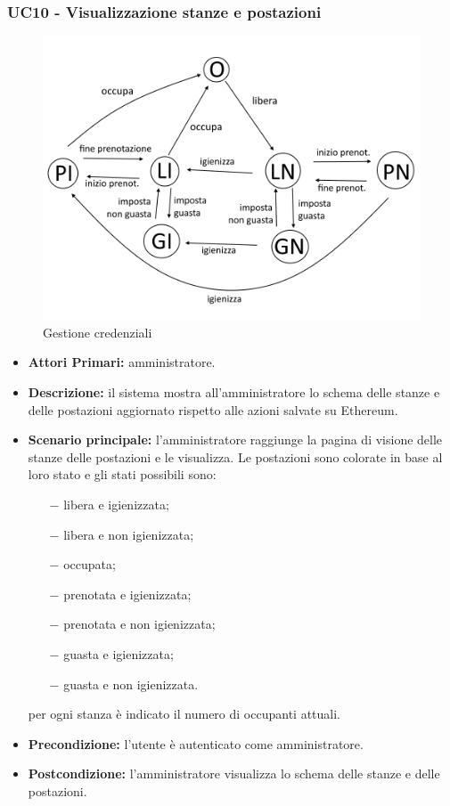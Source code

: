 \subsubsection{ UC10 - Visualizzazione stanze e postazioni}
\begin{figure}[H]
	\centering
	\includegraphics[width=15cm]{res/images/UC10.png}
	\caption{Gestione credenziali}
	\label{fig:stati postazioni}
\end{figure}
\begin{itemize}
	\item\textbf{Attori Primari:}
	amministratore.
	\item\textbf{Descrizione:}
	il sistema mostra all'amministratore lo schema delle stanze e delle postazioni aggiornato rispetto alle azioni salvate su Ethereum.
	\item\textbf{Scenario principale:}
	l'amministratore raggiunge la pagina di visione delle stanze delle postazioni e le visualizza. Le postazioni sono colorate in base al loro stato e gli stati possibili sono:
	\begin{itemize}
		\item[$-$] libera e igienizzata;
		\item[$-$] libera e non igienizzata;
		\item[$-$] occupata;
		\item[$-$] prenotata e igienizzata;
		\item[$-$] prenotata e non igienizzata;
		\item[$-$] guasta e igienizzata;
		\item[$-$] guasta e non igienizzata.
	\end{itemize}
	per ogni stanza è indicato il numero di occupanti attuali.
	\item\textbf{Precondizione:} 
	l'utente è autenticato come amministratore.
	\item\textbf{Postcondizione:}
	l'amministratore visualizza lo schema delle stanze e delle postazioni.
\end{itemize}


